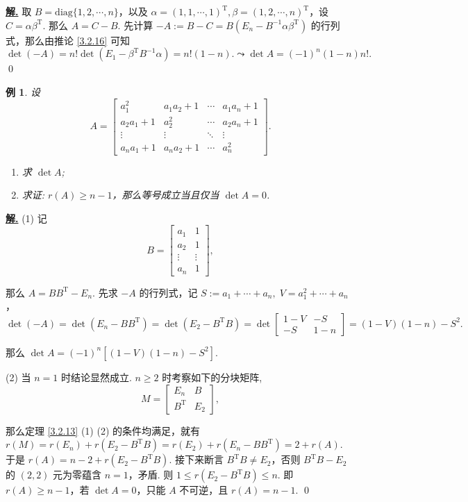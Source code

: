 \documentclass[10pt,openany]{article}
\theoremstyle{thmstyle} %
\theoremstyle{defstyle} %
\theoremstyle{prostyle} %
\theoremstyle{exastyle}
\newtheorem{example}[theorem]{例}
\theoremstyle{remstyle}
\newenvironment{solution}{\par\underline{\textbf{解.}} \;\fangsong}{\qed\par}
\newcommand{\T}{^{\text{T}}}
\newcommand{\diag}{\mathrm{diag}}
\begin{document}
\begin{solution}
	取 \( B=\diag\{1,2,\cdots,n\} \)，以及 \( \alpha=(1,1,\cdots,1)\T, \beta=(1,2,\cdots,n)\T \)，设 \( C=\alpha\beta\T \). 那么 \( A=C-B \). 先计算 \( -A:=B-C=B(E_n-B^{-1}\alpha\beta\T) \) 的行列式，那么由推论 \ref{3.2.16} 可知
	\[ \det(-A)= n! \det(E_1-\beta\T B^{-1}\alpha)=n! (1-n). \leadsto \det A=(-1)^{n}(1-n)n!. \]
\end{solution}


\begin{example} \label{3.2.19}
	设
	\[ A=\begin{bmatrix}
		a_1^2 & a_1 a_2 + 1 & \cdots & a_1 a_n + 1 \\
		a_2 a_1 + 1 & a_2^2 & \cdots & a_2 a_n + 1 \\
		\vdots & \vdots & \ddots & \vdots \\
		a_n a_1 + 1 & a_n a_2 + 1 & \cdots & a_n^2
	\end{bmatrix}. \]
	
	\begin{enumerate}[(1)]
		\item 求 \( \det A \);
		\item 求证: \( r(A) \geq n-1 \)，那么等号成立当且仅当 \( \det A=0 \). 
	\end{enumerate}
\end{example}


\begin{solution}
	(1) 记
	\[ B=\begin{bmatrix}
		a_1 & 1 \\ 
		a_2 & 1 \\
		\vdots & \vdots \\
		a_n & 1
	\end{bmatrix}, \]
	
	那么 \( A=BB\T-E_n \). 先求 \( -A \) 的行列式，记 \( S:=a_1+\cdots+a_n, \; V=a_1^2+\cdots+a_n \)，
	\[ \det (-A)= \det (E_n-BB\T)= \det(E_2-B\T B)= \det \begin{bmatrix}
		1-V & -S \\
		-S & 1-n
	\end{bmatrix}= (1-V)(1-n)-S^2. \]
	
	那么 \( \det A=(-1)^n[(1-V)(1-n)-S^2] \).
	
	\vspace{1ex}
	
	(2) 当 \( n=1 \) 时结论显然成立. \( n \geq 2 \) 时考察如下的分块矩阵,
	\[ M=\begin{bmatrix}
		E_n & B \\
		B\T & E_2
	\end{bmatrix}, \]
	
	那么定理 \ref{3.2.13} (1) (2) 的条件均满足，就有 \( r(M)= r(E_n)+r(E_2-B\T B)=r(E_2)+r(E_n-BB\T)=2+r(A) \). 于是 \( r(A)=n-2+r(E_2-B\T B) \). 接下来断言 \( B\T B \neq E_2 \)，否则 \( B\T B-E_2 \) 的 \( (2,2) \) 元为零蕴含 \( n=1 \)，矛盾. 则 \( 1 \leq r(E_2-B\T B) \leq n \). 即 \( r(A) \geq n-1 \)，若 \( \det A=0 \)，只能 \( A \) 不可逆，且 \( r(A)=n-1 \). 
\end{solution}
\end{document}
